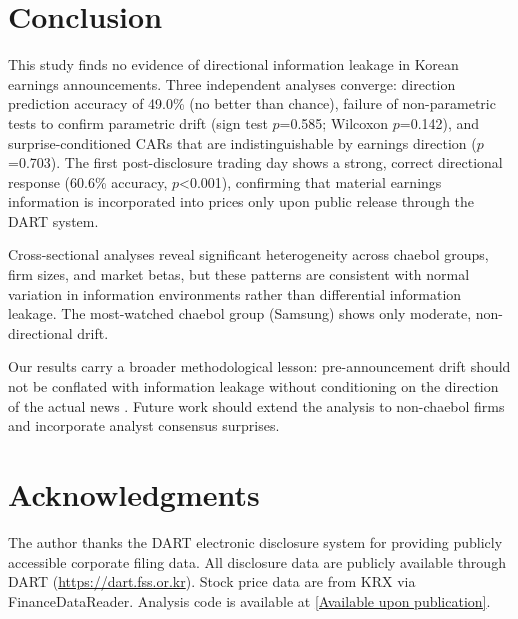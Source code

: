 \documentclass[review,authoryear]{elsarticle}
\begin{document}
\section{Conclusion}
\label{sec:conclusion}

This study finds no evidence of directional information leakage in Korean earnings announcements. Three independent analyses converge: direction prediction accuracy of 49.0\% (no better than chance), failure of non-parametric tests to confirm parametric drift (sign test $p$=0.585; Wilcoxon $p$=0.142), and surprise-conditioned CARs that are indistinguishable by earnings direction ($p$=0.703). The first post-disclosure trading day shows a strong, correct directional response (60.6\% accuracy, $p$<0.001), confirming that material earnings information is incorporated into prices only upon public release through the DART system.

Cross-sectional analyses reveal significant heterogeneity across chaebol groups, firm sizes, and market betas, but these patterns are consistent with normal variation in information environments rather than differential information leakage. The most-watched chaebol group (Samsung) shows only moderate, non-directional drift.

Our results carry a broader methodological lesson: pre-announcement drift should not be conflated with information leakage without conditioning on the direction of the actual news \citep{meulbroek1992comparison, bernile2016can, atiase1985predisclosure}. Future work should extend the analysis to non-chaebol firms and incorporate analyst consensus surprises.

\section*{Acknowledgments}

The author thanks the DART electronic disclosure system for providing publicly accessible corporate filing data. All disclosure data are publicly available through DART (\url{https://dart.fss.or.kr}). Stock price data are from KRX via FinanceDataReader. Analysis code is available at \url{[Available upon publication]}.



\end{document}
